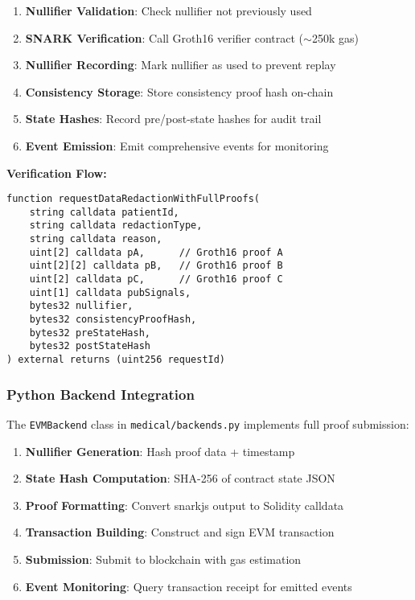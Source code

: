 \begin{enumerate}
    \item \textbf{Nullifier Validation}: Check nullifier not previously used
    \item \textbf{SNARK Verification}: Call Groth16 verifier contract ($\sim$250k gas)
    \item \textbf{Nullifier Recording}: Mark nullifier as used to prevent replay
    \item \textbf{Consistency Storage}: Store consistency proof hash on-chain
    \item \textbf{State Hashes}: Record pre/post-state hashes for audit trail
    \item \textbf{Event Emission}: Emit comprehensive events for monitoring
\end{enumerate}

\textbf{Verification Flow:}
\begin{verbatim}
function requestDataRedactionWithFullProofs(
    string calldata patientId,
    string calldata redactionType,
    string calldata reason,
    uint[2] calldata pA,      // Groth16 proof A
    uint[2][2] calldata pB,   // Groth16 proof B
    uint[2] calldata pC,      // Groth16 proof C
    uint[1] calldata pubSignals,
    bytes32 nullifier,
    bytes32 consistencyProofHash,
    bytes32 preStateHash,
    bytes32 postStateHash
) external returns (uint256 requestId)
\end{verbatim}

\subsubsection{Python Backend Integration}

The \texttt{EVMBackend} class in \texttt{medical/backends.py} implements full proof submission:

\begin{enumerate}
    \item \textbf{Nullifier Generation}: Hash proof data + timestamp
    \item \textbf{State Hash Computation}: SHA-256 of contract state JSON
    \item \textbf{Proof Formatting}: Convert snarkjs output to Solidity calldata
    \item \textbf{Transaction Building}: Construct and sign EVM transaction
    \item \textbf{Submission}: Submit to blockchain with gas estimation
    \item \textbf{Event Monitoring}: Query transaction receipt for emitted events
\end{enumerate}

